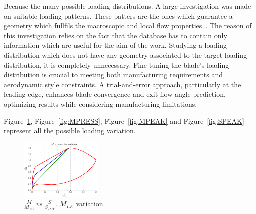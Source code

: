 \documentclass[11pt,a4paper,twocolumn]{article}
\newcommand\width{0.35}
\begin{document}

Because the many possible loading distributions. A large investigation was made on suitable loading patterns. These patters are the ones which guarantee a geometry which fullfils the macroscopic and local flow properties~\cite{clark2019step}.
The reason of this investigation relies on the fact that the database has to contain only information which are useful for the aim of the work. Studying a loading distribution which does not have any geometry associated to the target loading distribution, it is completely unnecessary. 
Fine-tuning the blade's loading distribution is crucial to meeting both manufacturing requirements and aerodynamic style constraints. A trial-and-error approach, particularly at the leading edge, enhances blade convergence and exit flow angle prediction, optimizing results while considering manufacturing limitations.

Figure~\ref{fig:MLE}, Figure~\ref{fig:MPRESS}, Figure~\ref{fig:MPEAK} and Figure~\ref{fig:SPEAK} represent all the possible loading variation.

\begin{figure}[!h]
    \centering
    \includegraphics[width=\width\textwidth]{pyFigure/figures/load-MLE.eps}
    \caption{$\frac{M}{M_{TE}} \ vs \ \frac{S}{S_{TOT}}$. $M_{LE}$ variation.}    
    \label{fig:MLE}
\end{figure}
\end{document}

